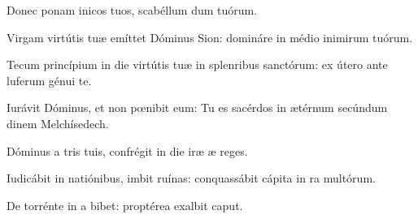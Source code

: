 \item {}

\item Donec ponam inicos tuos,\psstar{} scabéllum dum tuórum.

\item Virgam virtútis tuæ emíttet Dóminus  Sion:\psstar{} domináre in médio inimirum tuórum.

\item Tecum princípium in die virtútis tuæ in splenribus sanctórum:\psstar{} ex útero ante luferum génui te.

\item Iurávit Dóminus, et non pœnibit eum:\psstar{} Tu es sacérdos in ætérnum secúndum dinem Melchísedech.

\item Dóminus a tris tuis,\psstar{} confrégit in die iræ æ reges.

\item Iudicábit in natiónibus, imbit ruínas:\psstar{} conquassábit cápita in ra multórum.

\item De torrénte in a bibet:\psstar{} proptérea exalbit caput.
